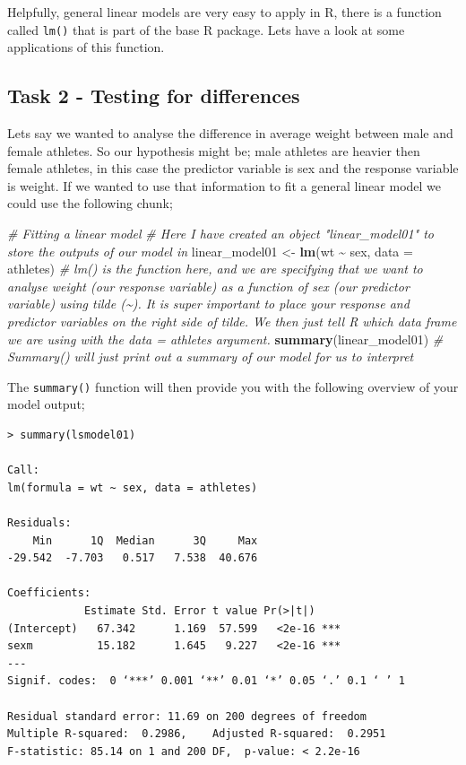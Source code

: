 \documentclass[
]{book}
\newenvironment{Shaded}{\begin{snugshade}}{\end{snugshade}}
\newcommand{\AttributeTok}[1]{\textcolor[rgb]{0.13,0.29,0.53}{#1}}
\newcommand{\CommentTok}[1]{\textcolor[rgb]{0.56,0.35,0.01}{\textit{#1}}}
\newcommand{\FunctionTok}[1]{\textcolor[rgb]{0.13,0.29,0.53}{\textbf{#1}}}
\newcommand{\NormalTok}[1]{#1}
\newcommand{\OtherTok}[1]{\textcolor[rgb]{0.56,0.35,0.01}{#1}}
\newcommand{\SpecialCharTok}[1]{\textcolor[rgb]{0.81,0.36,0.00}{\textbf{#1}}}
\begin{document}
Helpfully, general linear models are very easy to apply in R, there is a function called \texttt{lm()} that is part of the base R package. Lets have a look at some applications of this function.

\hypertarget{task-2---testing-for-differences}{%
\subsection{Task 2 - Testing for differences}\label{task-2---testing-for-differences}}

Lets say we wanted to analyse the difference in average weight between male and female athletes. So our hypothesis might be; male athletes are heavier then female athletes, in this case the predictor variable is sex and the response variable is weight. If we wanted to use that information to fit a general linear model we could use the following chunk;

\begin{Shaded}
\begin{Highlighting}[]
\CommentTok{\# Fitting a linear model }
\CommentTok{\# Here I have created an object "linear\_model01" to store the outputs of our model in}
\NormalTok{linear\_model01 }\OtherTok{\textless{}{-}} \FunctionTok{lm}\NormalTok{(wt }\SpecialCharTok{\textasciitilde{}}\NormalTok{ sex, }\AttributeTok{data =}\NormalTok{ athletes) }\CommentTok{\# lm() is the function here, and we are specifying that we want to analyse weight (our response variable) as a function of sex (our predictor variable) using tilde (\textasciitilde{}). It is super important to place your response and predictor variables on the right side of tilde. We then just tell R which data frame we are using with the data = athletes argument. }
\FunctionTok{summary}\NormalTok{(linear\_model01) }\CommentTok{\# Summary() will just print out a summary of our model for us to interpret }
\end{Highlighting}
\end{Shaded}

The \texttt{summary()} function will then provide you with the following overview of your model output;

\begin{verbatim}
> summary(lsmodel01)

Call:
lm(formula = wt ~ sex, data = athletes)

Residuals:
    Min      1Q  Median      3Q     Max 
-29.542  -7.703   0.517   7.538  40.676 

Coefficients:
            Estimate Std. Error t value Pr(>|t|)    
(Intercept)   67.342      1.169  57.599   <2e-16 ***
sexm          15.182      1.645   9.227   <2e-16 ***
---
Signif. codes:  0 ‘***’ 0.001 ‘**’ 0.01 ‘*’ 0.05 ‘.’ 0.1 ‘ ’ 1

Residual standard error: 11.69 on 200 degrees of freedom
Multiple R-squared:  0.2986,    Adjusted R-squared:  0.2951 
F-statistic: 85.14 on 1 and 200 DF,  p-value: < 2.2e-16
\end{verbatim}
\end{document}
